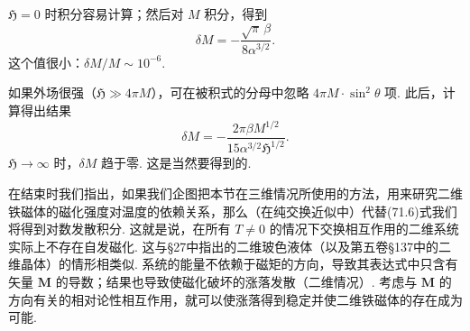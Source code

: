 $\mathfrak{H}=0$ 时积分容易计算；然后对 $M$ 积分，得到
\begin{equation}
\delta M=-\frac{\sqrt{\pi}\,\beta}{8\alpha^{3/2}}.
\end{equation}
这个值很小：$\delta M/M\sim10^{-6}$.

如果外场很强（$\mathfrak{H}\gg4\pi M$），可在被积式的分母中忽略 $4\pi M\cdot\sin^2\theta$ 项. 此后，计算得出结果
\begin{equation}
\delta M=-\frac{2\pi\beta M^{1/2}}{15\alpha^{3/2}\mathfrak{H}^{1/2}}.
\end{equation}
$\mathfrak{H}\to\infty$ 时，$\delta M$ 趋于零. 这是当然要得到的.

在结束时我们指出，如果我们企图把本节在三维情况所使用的方法，用来研究二维铁磁体的磁化强度对温度的依赖关系，那么（在纯交换近似中）代替(71.6)式我们将得到对数发散积分. 这就是说，在所有 $T\neq0$ 的情况下交换相互作用的二维系统实际上不存在自发磁化. 这与§27中指出的二维玻色液体（以及第五卷§137中的二维晶体）的情形相类似. 系统的能量不依赖于磁矩的方向，导致其表达式中只含有矢量 $\bm{M}$ 的导数；结果也导致使磁化破坏的涨落发散（二维情况）. 考虑与 $\bm{M}$ 的方向有关的相对论性相互作用，就可以使涨落得到稳定并使二维铁磁体的存在成为可能.

